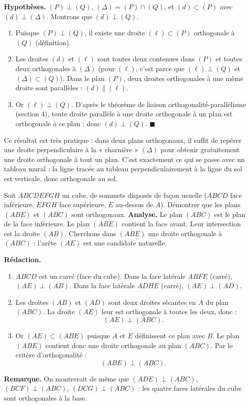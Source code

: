 \documentclass[11pt]{article}
\newcounter{popsec}
\newcounter{popsub}
\newcommand{\courssub}[1]{%
  \stepcounter{popsub}%
  \par\vspace{9pt}\noindent{\popxbold\fontsize{11.5}{13}\selectfont\color{popink}{\color{poporange}\thepopsec.\thepopsub}\hspace{6pt}#1}\par\nopagebreak\vspace{4pt}
}
\begin{document}
\begin{experience}
\textbf{Hypothèses.} $(P) \perp (Q)$, $(\Delta) = (P) \cap (Q)$, et $(d) \subset (P)$ avec $(d) \perp (\Delta)$. Montrons que $(d) \perp (Q)$.
\begin{enumerate}
\item Puisque $(P) \perp (Q)$, il existe une droite $(\ell) \subset (P)$ orthogonale à $(Q)$ (définition).
\item Les droites $(d)$ et $(\ell)$ sont toutes deux contenues dans $(P)$ et toutes deux orthogonales à $(\Delta)$ (pour $(\ell)$, c'est parce que $(\ell) \perp (Q)$ et $(\Delta) \subset (Q)$). Dans le plan $(P)$, deux droites orthogonales à une même droite sont parallèles : $(d) \parallel (\ell)$.
\item Or $(\ell) \perp (Q)$. D'après le théorème de liaison orthogonalité-parallélisme (section 4), toute droite parallèle à une droite orthogonale à un plan est orthogonale à ce plan : donc $(d) \perp (Q)$. $\blacksquare$
\end{enumerate}
\end{experience}

Ce résultat est très pratique : dans deux plans orthogonaux, il suffit de repérer une droite perpendiculaire à la « charnière » $(\Delta)$ pour obtenir gratuitement une droite orthogonale à tout un plan. C'est exactement ce qui se passe avec un tableau mural : la ligne tracée au tableau perpendiculairement à la ligne du sol est verticale, donc orthogonale au sol.

\courssub{Exercice résolu dans le cube}

\begin{exoresolu}
Soit $ABCDEFGH$ un cube, de sommets disposés de façon usuelle ($ABCD$ face inférieure, $EFGH$ face supérieure, $E$ au-dessus de $A$). Démontrer que les plans $(ABE)$ et $(ABC)$ sont orthogonaux.
\tcblower
\textbf{Analyse.} Le plan $(ABC)$ est le plan de la face inférieure. Le plan $(ABE)$ contient la face avant. Leur intersection est la droite $(AB)$. Cherchons dans $(ABE)$ une droite orthogonale à $(ABC)$ : l'arête $(AE)$ est une candidate naturelle.

\textbf{Rédaction.}
\begin{enumerate}
\item $ABCD$ est un carré (face du cube). Dans la face latérale $ABFE$ (carré), $(AE) \perp (AB)$. Dans la face latérale $ADHE$ (carré), $(AE) \perp (AD)$.
\item Les droites $(AB)$ et $(AD)$ sont deux droites sécantes en $A$ du plan $(ABC)$. La droite $(AE)$ leur est orthogonale à toutes les deux, donc :
\[ (AE) \perp (ABC). \]
\item Or $(AE) \subset (ABE)$ puisque $A$ et $E$ définissent ce plan avec $B$. Le plan $(ABE)$ contient donc une droite orthogonale au plan $(ABC)$. Par le critère d'orthogonalité :
\[ (ABE) \perp (ABC). \]
\end{enumerate}
\textbf{Remarque.} On montrerait de même que $(ADE) \perp (ABC)$, $(BCF) \perp (ABC)$, $(DCG) \perp (ABC)$ : les quatre faces latérales du cube sont orthogonales à la base.
\end{exoresolu}
\end{document}
